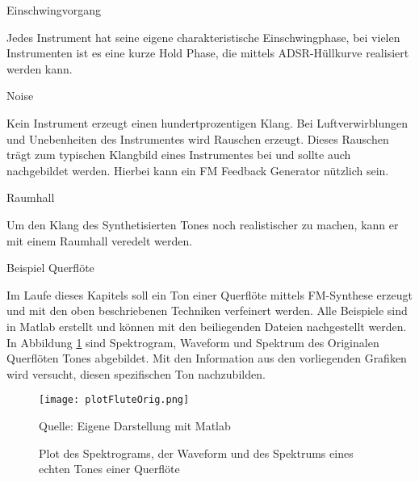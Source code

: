 Einschwingvorgang

Jedes Instrument hat seine eigene charakteristische Einschwingphase, bei vielen Instrumenten ist es eine kurze Hold Phase, die mittels ADSR-Hüllkurve realisiert werden kann.

Noise

Kein Instrument erzeugt einen hundertprozentigen Klang. Bei Luftverwirblungen und Unebenheiten des Instrumentes wird Rauschen erzeugt. Dieses Rauschen trägt zum typischen Klangbild eines Instrumentes bei und sollte auch nachgebildet werden. Hierbei kann ein FM Feedback Generator nützlich sein.

Raumhall

Um den Klang des Synthetisierten Tones noch realistischer zu machen, kann er mit einem Raumhall veredelt werden.


Beispiel Querflöte

Im Laufe dieses Kapitels soll ein Ton einer Querflöte mittels FM-Synthese erzeugt und mit den oben beschriebenen Techniken verfeinert werden. Alle Beispiele sind in Matlab erstellt und können mit den beiliegenden Dateien nachgestellt werden. In Abbildung \ref{fig:plotFluteOrig} sind Spektrogram, Waveform und Spektrum des Originalen Querflöten Tones abgebildet. Mit den Information aus den vorliegenden Grafiken wird versucht, diesen spezifischen Ton nachzubilden.

\begin{figure} [ht]
\centering
  \texttt{[image: plotFluteOrig.png]}
\caption{Plot des Spektrograms, der Waveform und des Spektrums eines echten Tones einer Querflöte}
\label{fig:plotFluteOrig}
Quelle: Eigene Darstellung mit Matlab
\end{figure}

